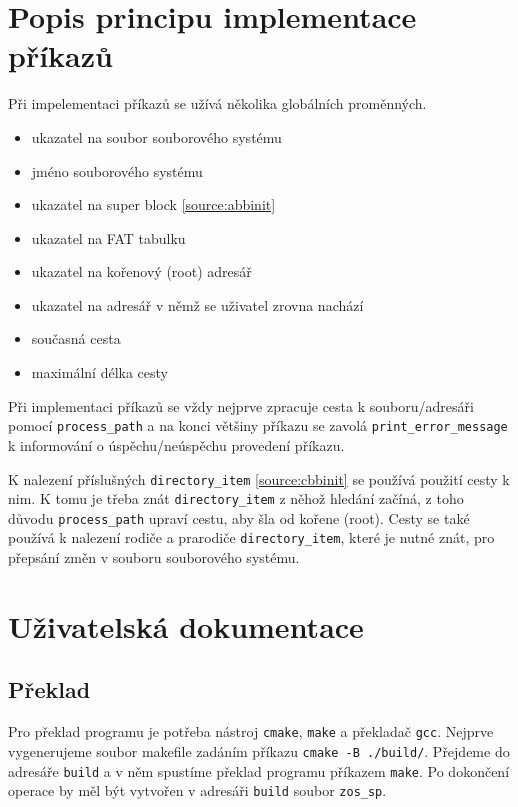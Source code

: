\documentclass[12pt]{report}
\begin{document}
	\section*{Popis principu implementace příkazů}
	\par Při impelementaci příkazů se užívá několika globálních proměnných.
	\begin{itemize}
		\item ukazatel na soubor souborového systému
		\item jméno souborového systému
		\item ukazatel na super block \ref{source:abbinit}
		\item ukazatel na FAT tabulku
		\item ukazatel na kořenový (root) adresář
		\item ukazatel na adresář v němž se uživatel zrovna nachází
		\item současná cesta
		\item maximální délka cesty
	\end{itemize}
	\par Při implementaci příkazů se vždy nejprve zpracuje cesta k souboru/adresáři pomocí \texttt{process\_path} a na konci většiny příkazu se zavolá \texttt{print\_error\_message} k informování o úspěchu/neúspěchu provedení příkazu.
	\par K nalezení příslušných \texttt{directory\_item} \ref{source:cbbinit} se používá použití cesty k nim. K tomu je třeba znát \texttt{directory\_item} z něhož hledání začíná, z toho důvodu \texttt{process\_path} upraví cestu, aby šla od kořene (root). Cesty se také používá k nalezení rodiče a prarodiče \texttt{directory\_item}, které je nutné znát, pro přepsání změn v souboru souborového systému.
	
	\section*{Uživatelská dokumentace}
	\subsection*{Překlad}
	\par Pro překlad programu je potřeba nástroj \texttt{cmake}, \texttt{make} a překladač \texttt{gcc}. Nejprve vygenerujeme soubor makefile zadáním příkazu \texttt{cmake -B ./build/}. Přejdeme do adresáře \texttt{build} a v něm spustíme překlad programu příkazem \texttt{make}. Po dokončení operace by měl být vytvořen v adresáři \texttt{build} soubor \texttt{zos\_sp}. 
	
\end{document}
